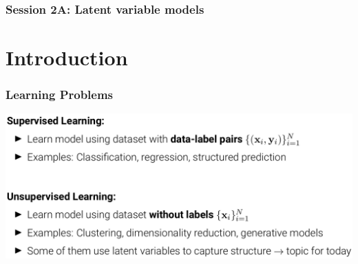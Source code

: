 \documentclass[10pt,aspectratio=169]{beamer}
\begin{document}
\begin{frame}
    \frametitle{Session 2A: Latent variable models}
    \tableofcontents
\end{frame}

\section{Introduction}



\begin{frame}
  \frametitle{Learning Problems}
\begin{center}
\includegraphics[width=.9\textwidth]{images/s1}
\end{center}

\end{frame}
\end{document}
